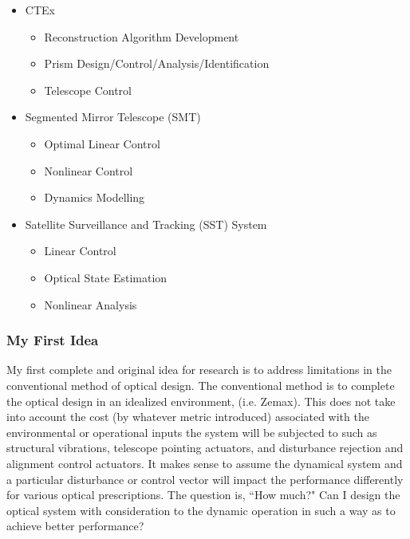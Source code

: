 \documentclass{article}
\begin{document}
\begin{itemize}
	\item CTEx
		\begin{itemize}
			\item Reconstruction Algorithm Development
			\item Prism Design/Control/Analysis/Identification
			\item Telescope Control
		\end{itemize}
	\item Segmented Mirror Telescope (SMT)
		\begin{itemize}
			\item Optimal Linear Control
			\item Nonlinear Control
			\item Dynamics Modelling
		\end{itemize}
	\item Satellite Surveillance and Tracking (SST) System
		\begin{itemize}
			\item Linear Control
			\item Optical State Estimation
			\item Nonlinear Analysis
		\end{itemize}
\end{itemize}

\subsubsection{My First Idea}
My first complete and original idea for research is to address limitations in the conventional method of optical design. The conventional method is to complete the optical design in an idealized environment, (i.e. Zemax). This does not take into account the cost (by whatever metric introduced) associated with the environmental or operational inputs the system will be subjected to such as structural vibrations, telescope pointing actuators, and disturbance rejection and alignment control actuators. It makes sense to assume the dynamical system and a particular disturbance or control vector will impact the performance differently for various optical prescriptions. The question is, ``How much?" Can I design the optical system with consideration to the dynamic operation in such a way as to achieve better performance?
\end{document}
